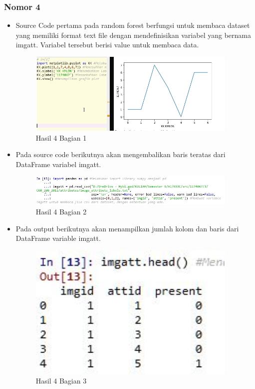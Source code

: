 \subsubsection{Nomor 4}
\hfill\break

\begin{itemize}
\item Source Code pertama pada random forest berfungsi untuk membaca dataset yang memiliki format text file dengan mendefinisikan variabel yang bernama imgatt. Variabel tersebut berisi value untuk membaca data.

\begin{figure}[H]
\centerline{\includegraphics[width=10cm]{figures/1174080/3/6.jpg}}
\caption{Hasil 4 Bagian 1}
\label{labelgambar}
\end{figure}

\item Pada source code berikutnya akan mengembalikan baris teratas dari DataFrame variabel imgatt.

\begin{figure}[H]
\centerline{\includegraphics[width=10cm]{figures/1174080/3/7.jpg}}
\caption{Hasil 4 Bagian 2}
\label{labelgambar}
\end{figure}

\item Pada output berikutnya akan menampilkan jumlah kolom dan baris dari DataFrame variable imgatt.

\begin{figure}[H]
\centerline{\includegraphics[width=10cm]{figures/1174080/3/8.jpg}}
\caption{Hasil 4 Bagian 3}
\label{labelgambar}
\end{figure}


\end{itemize}
